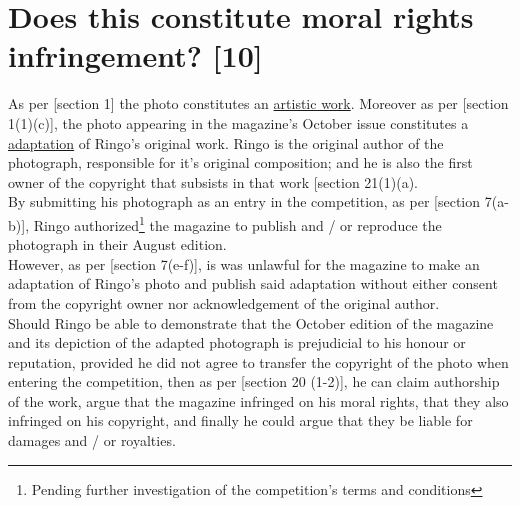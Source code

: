 \documentclass[11pt]{article}
\begin{document}
\section{Does this constitute moral rights infringement? [10]}
\label{sec:orgbe57fd1}
As per [section 1]\cite{rsa78_copyrightact} the photo constitutes an
\uline{artistic work}. Moreover as per [section 1(1)(c)]\cite{rsa78_copyrightact}, the
photo appearing in the magazine's October issue constitutes a \uline{adaptation} of
Ringo's original work. Ringo is the original author of the photograph,
responsible for it's original composition; and he is also the first owner of the copyright that subsists in that work [section 21(1)(a).\\

By submitting his photograph as an entry in the competition, as per [section
7(a-b)]\cite{rsa78_copyrightact}, Ringo authorized\footnote{Pending further
investigation of the competition's terms and conditions} the magazine to
publish and / or reproduce the photograph in their August edition.\\

However, as per [section 7(e-f)]\cite{rsa78_copyrightact}, is was unlawful for
the magazine to make an adaptation of Ringo's photo and publish said
adaptation without either consent from the copyright owner nor acknowledgement
of the original author.\\

Should Ringo be able to demonstrate that the October edition of the magazine
and its depiction of the adapted photograph is prejudicial to his honour or
reputation, provided he did not agree to transfer the copyright of the photo
when entering the competition, then as per [section 20
(1-2)]\cite{rsa78_copyrightact}, he can claim authorship of the work, argue that
the magazine infringed on his moral rights, that they also infringed on
his copyright, and finally he could argue that they be liable for damages and
/ or royalties.
\end{document}
